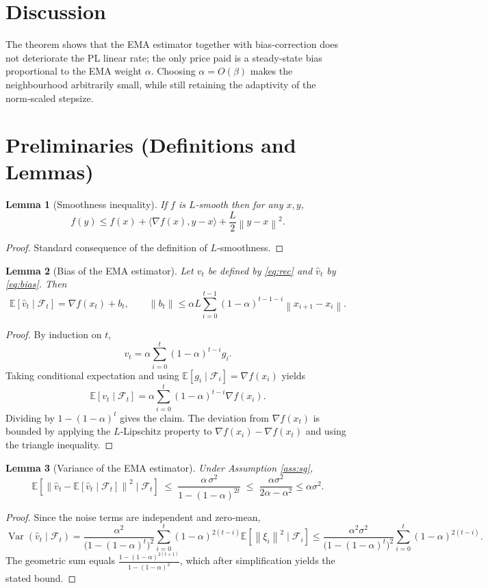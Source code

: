 \documentclass{article}
\newtheorem{lemma}{Lemma}
\newcommand{\E}{\mathbb{E}}
\newcommand{\norm}[1]{\left\lVert#1\right\rVert}
\begin{document}
\section*{Discussion}
The theorem shows that the EMA estimator together with bias‑correction
does not deteriorate the PL linear rate; the only price paid is a
steady‑state bias proportional to the EMA weight $\alpha$.
Choosing $\alpha=O(\beta)$ makes the neighbourhood arbitrarily small,
while still retaining the adaptivity of the norm‑scaled stepsize.

\newpage
\section*{Preliminaries (Definitions and Lemmas)}
\begin{lemma}[Smoothness inequality]\label{lem:smooth}
If $f$ is $L$‑smooth then for any $x,y$,
\[
f(y)\le f(x)+\langle\nabla f(x),y-x\rangle+\frac{L}{2}\norm{y-x}^{2}.
\]
\end{lemma}
\begin{proof}
Standard consequence of the definition of $L$‑smoothness.
\end{proof}
\begin{lemma}[Bias of the EMA estimator]\label{lem:bias}
Let $v_t$ be defined by \eqref{eq:rec} and $\hat v_t$ by \eqref{eq:bias}. Then
\[
\E[\hat v_t\mid\mathcal{F}_{t}]
=\nabla f(x_t)+b_t,
\qquad
\norm{b_t}\le \alpha L\sum_{i=0}^{t-1}
(1-\alpha)^{t-1-i}\norm{x_{i+1}-x_i}.
\]
\end{lemma}
\begin{proof}
By induction on $t$,
\[
v_t=\alpha\sum_{i=0}^{t}(1-\alpha)^{t-i}g_i.
\]
Taking conditional expectation and using $\E[g_i\mid\mathcal{F}_{i}]
=\nabla f(x_i)$ yields
\[
\E[v_t\mid\mathcal{F}_{t}]
=\alpha\sum_{i=0}^{t}(1-\alpha)^{t-i}\nabla f(x_i).
\]
Dividing by $1-(1-\alpha)^t$ gives the claim.  The deviation from
$\nabla f(x_t)$ is bounded by applying the $L$‑Lipschitz property to
$\nabla f(x_i)-\nabla f(x_t)$ and using the triangle inequality.
\end{proof}
\begin{lemma}[Variance of the EMA estimator]\label{lem:var}
Under Assumption \ref{ass:sg},
\[
\E\!\left[\norm{\hat v_t-\E[\hat v_t\mid\mathcal{F}_{t}]}^{2}\mid\mathcal{F}_{t}\right]
\;\le\;\frac{\alpha\,\sigma^{2}}{1-(1-\alpha)^{2t}}\;\le\;\frac{\alpha\sigma^{2}}{2\alpha-\alpha^{2}}
\le\alpha\sigma^{2}.
\]
\end{lemma}
\begin{proof}
Since the noise terms are independent and zero‑mean,
\[
\operatorname{Var}(\hat v_t\mid\mathcal{F}_{t})
= \frac{\alpha^{2}}{\bigl(1-(1-\alpha)^{t}\bigr)^{2}}
\sum_{i=0}^{t}(1-\alpha)^{2(t-i)}\E\!\left[\norm{\xi_i}^{2}\mid\mathcal{F}_{i}\right]
\le\frac{\alpha^{2}\sigma^{2}}{\bigl(1-(1-\alpha)^{t}\bigr)^{2}}
\sum_{i=0}^{t}(1-\alpha)^{2(t-i)}.
\]
The geometric sum equals $\frac{1-(1-\alpha)^{2(t+1)}}{1-(1-\alpha)^{2}}$,
which after simplification yields the stated bound.
\end{proof}
\end{document}
